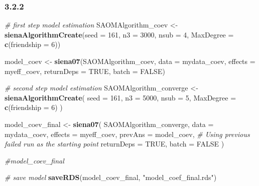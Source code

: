 \documentclass[
]{article}
\newenvironment{Shaded}{\begin{snugshade}}{\end{snugshade}}
\newcommand{\AttributeTok}[1]{\textcolor[rgb]{0.13,0.29,0.53}{#1}}
\newcommand{\CommentTok}[1]{\textcolor[rgb]{0.56,0.35,0.01}{\textit{#1}}}
\newcommand{\ConstantTok}[1]{\textcolor[rgb]{0.56,0.35,0.01}{#1}}
\newcommand{\DecValTok}[1]{\textcolor[rgb]{0.00,0.00,0.81}{#1}}
\newcommand{\FunctionTok}[1]{\textcolor[rgb]{0.13,0.29,0.53}{\textbf{#1}}}
\newcommand{\NormalTok}[1]{#1}
\newcommand{\OtherTok}[1]{\textcolor[rgb]{0.56,0.35,0.01}{#1}}
\newcommand{\StringTok}[1]{\textcolor[rgb]{0.31,0.60,0.02}{#1}}
\begin{document}
\subsubsection{3.2.2}\label{section-17}

\begin{Shaded}
\begin{Highlighting}[]
\CommentTok{\# first step model estimation}
\NormalTok{SAOMAlgorithm\_coev }\OtherTok{\textless{}{-}} \FunctionTok{sienaAlgorithmCreate}\NormalTok{(}\AttributeTok{seed =} \DecValTok{161}\NormalTok{, }\AttributeTok{n3 =} \DecValTok{3000}\NormalTok{, }\AttributeTok{nsub =} \DecValTok{4}\NormalTok{,}
                                           \AttributeTok{MaxDegree =} \FunctionTok{c}\NormalTok{(}\AttributeTok{friendship =} \DecValTok{6}\NormalTok{))}

\NormalTok{model\_coev }\OtherTok{\textless{}{-}} \FunctionTok{siena07}\NormalTok{(SAOMAlgorithm\_coev,}
                      \AttributeTok{data    =}\NormalTok{ mydata\_coev,}
                      \AttributeTok{effects =}\NormalTok{ myeff\_coev,}
                      \AttributeTok{returnDeps =} \ConstantTok{TRUE}\NormalTok{,}
                      \AttributeTok{batch =} \ConstantTok{FALSE}\NormalTok{)}

\CommentTok{\# second step model estimation}
\NormalTok{SAOMAlgorithm\_converge }\OtherTok{\textless{}{-}} \FunctionTok{sienaAlgorithmCreate}\NormalTok{(}
  \AttributeTok{seed =} \DecValTok{161}\NormalTok{, }
  \AttributeTok{n3 =} \DecValTok{5000}\NormalTok{, }
  \AttributeTok{nsub =} \DecValTok{5}\NormalTok{, }
  \AttributeTok{MaxDegree =} \FunctionTok{c}\NormalTok{(}\AttributeTok{friendship =} \DecValTok{6}\NormalTok{)}
\NormalTok{)}

\NormalTok{model\_coev\_final }\OtherTok{\textless{}{-}} \FunctionTok{siena07}\NormalTok{(}
\NormalTok{  SAOMAlgorithm\_converge,}
  \AttributeTok{data =}\NormalTok{ mydata\_coev,}
  \AttributeTok{effects =}\NormalTok{ myeff\_coev,}
  \AttributeTok{prevAns =}\NormalTok{ model\_coev, }\CommentTok{\# Using previous failed run as the starting point}
  \AttributeTok{returnDeps =} \ConstantTok{TRUE}\NormalTok{,}
  \AttributeTok{batch =} \ConstantTok{FALSE}
\NormalTok{)}

\CommentTok{\#model\_coev\_final}

\CommentTok{\# save model}
\FunctionTok{saveRDS}\NormalTok{(model\_coev\_final, }\StringTok{"model\_coef\_final.rds"}\NormalTok{)}
\end{Highlighting}
\end{Shaded}
\end{document}
